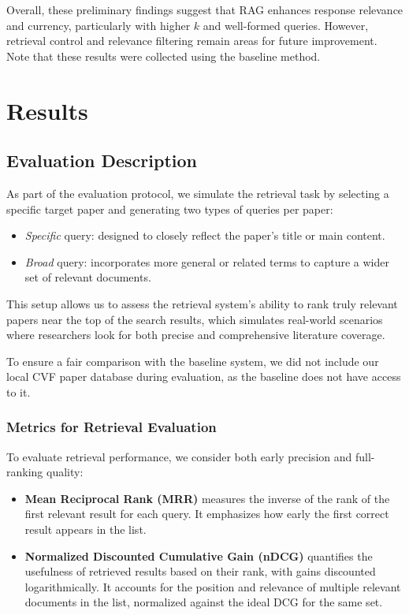 \documentclass[fleqn,moreauthors,10pt]{ds_report}
\begin{document}
Overall, these preliminary findings suggest that RAG enhances response relevance and currency, particularly with higher $k$
  and well-formed queries. However, retrieval control and relevance filtering remain
  areas for future improvement. Note that these results were collected using the baseline method. 
  
\section*{Results}

\subsection*{Evaluation Description}

As part of the evaluation protocol, we simulate the retrieval task by selecting a specific target paper
and generating two types of queries per paper:

\begin{itemize}
    \item \textit{Specific} query: designed to closely reflect the paper’s title or main content.
    \item \textit{Broad} query: incorporates more general or related terms to capture a wider set of relevant documents.
\end{itemize}

This setup allows us to assess the retrieval system’s ability to rank truly relevant papers near the top of the search results,
which simulates real-world scenarios where researchers look for both precise and comprehensive literature coverage.

To ensure a fair comparison with the baseline system, we did not include our local CVF paper database during evaluation,
as the baseline does not have access to it.

\subsubsection*{Metrics for Retrieval Evaluation}

To evaluate retrieval performance, we consider both early precision and full-ranking quality:

\begin{itemize}
    \item \textbf{Mean Reciprocal Rank (MRR)} measures the inverse of the rank of the first relevant result for each query. 
    It emphasizes how early the first correct result appears in the list.
    
    \item \textbf{Normalized Discounted Cumulative Gain (nDCG)} quantifies the usefulness of retrieved results based on their rank, 
    with gains discounted logarithmically. It accounts for the position and relevance of multiple relevant documents in the list, 
    normalized against the ideal DCG for the same set.
\end{itemize}
\end{document}
